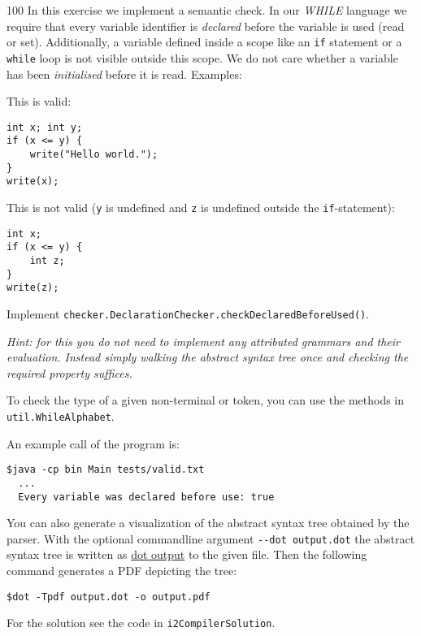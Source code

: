 \documentclass[a4paper]{article}
\begin{document}
\begin{exercise}{100}
In this exercise we implement a semantic check. In our \textit{WHILE} language we require that every variable identifier is \emph{declared} before the variable is used (read or set). Additionally, a variable defined inside a scope like an \texttt{if} statement or a \texttt{while} loop is not visible outside this scope. We do not care whether a variable has been \emph{initialised} before it is read. Examples:\newline

\begin{minipage}{0.5\textwidth}
This is valid:\ \\
\begin{lstlisting}[numbers=none]
int x; int y;
if (x <= y) {
    write("Hello world.");
}
write(x);
\end{lstlisting}
\end{minipage}
\begin{minipage}{0.5\textwidth}
This is not valid (\texttt{y} is undefined and \texttt{z} is undefined outside the \texttt{if}-statement):
\begin{lstlisting}[numbers=none]
int x;
if (x <= y) {
    int z;
}
write(z);
\end{lstlisting}

\end{minipage}

Implement \texttt{checker.DeclarationChecker.checkDeclaredBeforeUsed()}.

\emph{Hint: for this you do not need to implement any attributed grammars and their evaluation. Instead simply walking the abstract syntax tree once and checking the required property suffices.}

To check the type of a given non-terminal or token, you can use the methods in \texttt{util.WhileAlphabet}.

An example call of the program is:
\begin{lstlisting}[numbers=none,basicstyle=\ttfamily,breaklines=true]
  $java -cp bin Main tests/valid.txt
  ...
  Every variable was declared before use: true
\end{lstlisting}

You can also generate a visualization of the abstract syntax tree obtained by the parser. With the optional commandline argument \texttt{-{}-dot output.dot} the abstract syntax tree is written as \href{http://www.graphviz.org/documentation}{dot output} to the given file. Then the following command generates a PDF depicting the tree:
\begin{lstlisting}[numbers=none,basicstyle=\ttfamily,breaklines=true]
  $dot -Tpdf output.dot -o output.pdf
\end{lstlisting}
\end{exercise}

\begin{solution}
For the solution see the code in \texttt{i2CompilerSolution}.
\end{solution}
\end{document}

